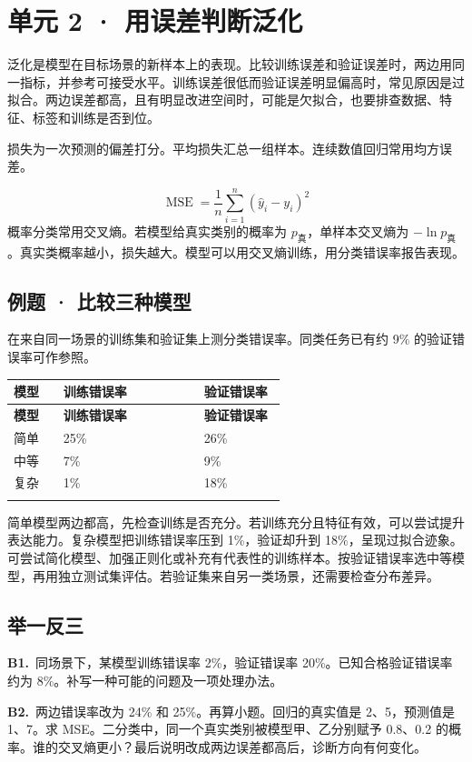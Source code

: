 \documentclass[UTF8,a4paper,11pt]{ctexart}
\newcommand{\PracticeQuestion}[3]{\par\Needspace{4\baselineskip}\noindent\begin{minipage}{\linewidth}\textbf{#1.}\ #2\par\noindent\rule{0pt}{#3mm}\par\end{minipage}\par}
\begin{document}
\section{单元 2 · 用误差判断泛化}
泛化是模型在目标场景的新样本上的表现。比较训练误差和验证误差时，两边用同一指标，并参考可接受水平。训练误差很低而验证误差明显偏高时，常见原因是过拟合。两边误差都高，且有明显改进空间时，可能是欠拟合，也要排查数据、特征、标签和训练是否到位。

损失为一次预测的偏差打分。平均损失汇总一组样本。连续数值回归常用均方误差。

\[\operatorname{MSE}=\frac{1}{n}\sum_{i=1}^n(\hat y_i-y_i)^2\]
概率分类常用交叉熵。若模型给真实类别的概率为 $p_{\text{真}}$，单样本交叉熵为 $-\ln p_{\text{真}}$。真实类概率越小，损失越大。模型可以用交叉熵训练，用分类错误率报告表现。

\subsection{例题 · 比较三种模型}
在来自同一场景的训练集和验证集上测分类错误率。同类任务已有约 9\% 的验证错误率可作参照。

{\small\renewcommand{\arraystretch}{1.38}\setlength{\tabcolsep}{3.5pt}
\begin{longtable}{P{0.17\linewidth}P{0.48\linewidth}P{0.28\linewidth}}
\toprule
\bfseries 模型 & \bfseries 训练错误率 & \bfseries 验证错误率 \\
\midrule
\endfirsthead
\toprule
\bfseries 模型 & \bfseries 训练错误率 & \bfseries 验证错误率 \\
\midrule
\endhead
简单 & 25\% & 26\% \\
\addlinespace[.35em]
中等 & 7\% & 9\% \\
\addlinespace[.35em]
复杂 & 1\% & 18\% \\
\addlinespace[.35em]
\bottomrule
\end{longtable}
}
简单模型两边都高，先检查训练是否充分。若训练充分且特征有效，可以尝试提升表达能力。复杂模型把训练错误率压到 1\%，验证却升到 18\%，呈现过拟合迹象。可尝试简化模型、加强正则化或补充有代表性的训练样本。按验证错误率选中等模型，再用独立测试集评估。若验证集来自另一类场景，还需要检查分布差异。

\clearpage
\subsection{举一反三}
\PracticeQuestion{B1}{同场景下，某模型训练错误率 2\%，验证错误率 20\%。已知合格验证错误率约为 8\%。补写一种可能的问题及一项处理办法。}{38}
\PracticeQuestion{B2}{两边错误率改为 24\% 和 25\%。再算小题。回归的真实值是 2、5，预测值是 1、7。求 MSE。二分类中，同一个真实类别被模型甲、乙分别赋予 0.8、0.2 的概率。谁的交叉熵更小？最后说明改成两边误差都高后，诊断方向有何变化。}{52}
\clearpage
\end{document}

